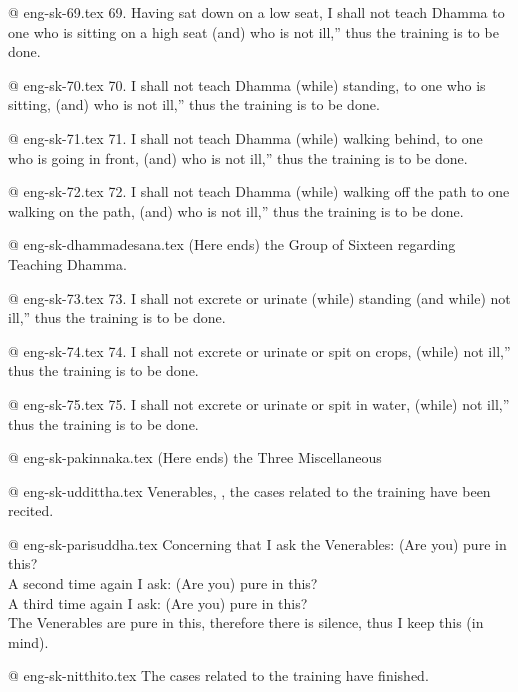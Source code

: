 @  eng-sk-69.tex
69. Having sat down on a low seat, I shall not teach Dhamma to one who is sitting on a high seat (and) who is not ill,” thus the training is to be done.

@  eng-sk-70.tex
70. I shall not teach Dhamma (while) standing, to one who is sitting, (and) who is not ill,” thus the training is to be done.

@  eng-sk-71.tex
71. I shall not teach Dhamma (while) walking behind, to one who is going in front, (and) who is not ill,” thus the training is to be done.

@  eng-sk-72.tex
72. I shall not teach Dhamma (while) walking off the path to one walking on the path, (and) who is not ill,” thus the training is to be done.

@ eng-sk-dhammadesana.tex
(Here ends) the Group of Sixteen regarding Teaching Dhamma.

@ eng-sk-73.tex
73. I shall not excrete or urinate (while) standing (and while) not ill,” thus the training is to be done.

@  eng-sk-74.tex
74. I shall not excrete or urinate or spit on crops, (while) not ill,” thus the training is to be done.

@  eng-sk-75.tex
75. I shall not excrete or urinate or spit in water, (while) not ill,” thus the training is to be done.

@ eng-sk-pakinnaka.tex
(Here ends) the Three Miscellaneous

@ eng-sk-uddittha.tex
Venerables, , the cases related to the training have been recited.

@ eng-sk-parisuddha.tex
Concerning that I ask the Venerables: (Are you) pure in this?\\
A second time again I ask: (Are you) pure in this?\\
A third time again I ask: (Are you) pure in this?\\
The Venerables are pure in this, therefore there is silence, thus I keep this (in mind).

@ eng-sk-nitthito.tex
The cases related to the training have finished.
